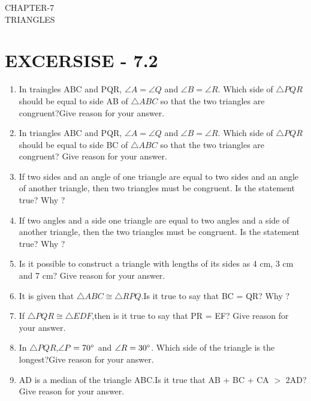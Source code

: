 \documentclass[12pt]{article}
\begin{document}
\begin{center}
\textbf\large{CHAPTER-7  \\  TRIANGLES}
\section*{EXCERSISE - 7.2}
\end{center}

\begin{enumerate}

\item In traingles ABC and PQR, $ \angle{A} = \angle{Q} $ and $ \angle{B} = \angle{R} $. Which side of $ \triangle{PQR} $ should be equal to side AB of $ \triangle{ABC} $ so that the two triangles are congruent?Give reason for your answer.

\item In triangles ABC and PQR, $ \angle{A} = \angle{Q} $ and $ \angle{B} = \angle{R} $. Which side of $ \triangle{PQR} $should be equal to side BC of $ \triangle{ABC} $ so that the two triangles are congruent? Give reason for your answer.

\item If two sides and an angle of one triangle are equal to two sides and an angle of another triangle, then two triangles must be congruent. Is the statement true? Why ?

\item If two angles and a side one triangle are equal to two angles and a side of another triangle, then the two triangles must be congruent. Is the statement true? Why ?

\item Is it possible to construct a triangle with lengths of its sides as 4 cm, 3 cm and 7 cm? Give reason for your answer.

\item It is given that $ \triangle{ABC} \cong \triangle{RPQ} $.Is it true to say that BC = QR? Why ?

\item If $ \triangle{PQR} \cong \triangle{EDF} $,then is it true to say that PR = EF? Give reason for your answer.

\item In $ \triangle{PQR} $,$ \angle{P} = 70\degree $ and $ \angle{R} = 30\degree $. Which side of the triangle is the longest?Give reason for your answer.

\item AD is a median of the triangle ABC.Is it true that AB + BC + CA $ > $ 2AD? Give reason for your answer.


\end{enumerate}
\end{document}
